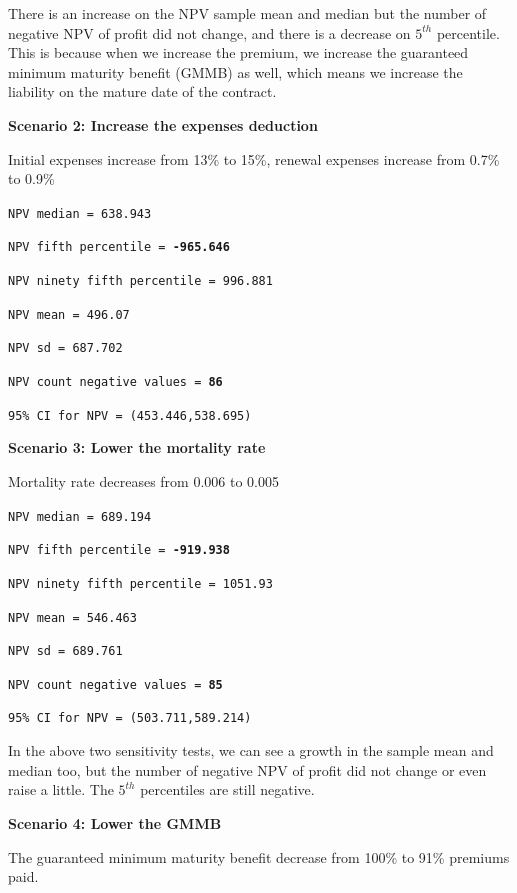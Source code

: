 \documentclass{report}
\begin{document}
There is an increase on the NPV sample mean and median but the number of negative NPV of profit did not change, and there is a decrease on $5^{th}$ percentile. This is because when we increase the premium, we increase the guaranteed minimum maturity benefit (GMMB) as well, which means we increase the liability on the mature date of the contract.


\textbf{Scenario 2: Increase the expenses deduction}

Initial expenses increase from 13\% to 15\%, renewal expenses increase from 0.7\% to 0.9\%


\texttt{NPV median = 638.943}

{\renewcommand\baselinestretch{1}\selectfont

\texttt{NPV fifth percentile = \textbf{-965.646}}

\texttt{NPV ninety fifth percentile = 996.881}

\texttt{NPV mean = 496.07}

\texttt{NPV sd = 687.702}

\texttt{NPV count negative values = \textbf{86}}

\texttt{95\% CI for NPV = (453.446,538.695)}
\par}



\textbf{Scenario 3: Lower the mortality rate}

Mortality rate decreases from 0.006 to 0.005

\texttt{NPV median = 689.194}

{\renewcommand\baselinestretch{1}\selectfont

\texttt{NPV fifth percentile = \textbf{-919.938}}

\texttt{NPV ninety fifth percentile = 1051.93}

\texttt{NPV mean = 546.463}

\texttt{NPV sd = 689.761}

\texttt{NPV count negative values = \textbf{85}}

\texttt{95\% CI for NPV = (503.711,589.214)}
\par}

In the above two sensitivity tests, we can see a growth in the sample mean and median too, but the number of negative NPV of profit did not change or even raise a little. The $5^{th}$ percentiles are still negative.


\textbf{Scenario 4: Lower the GMMB}

The guaranteed minimum maturity benefit decrease from 100\% to 91\% premiums paid.
\end{document}
